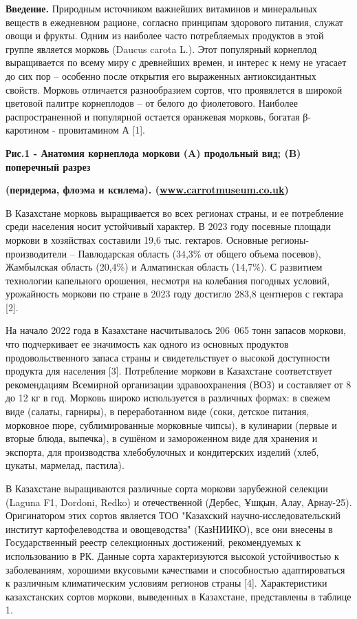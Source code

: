 {\bfseries Введение.} Природным источником важнейших витаминов и
минеральных веществ в ежедневном рационе, согласно принципам здорового
питания, служат овощи и фрукты. Одним из наиболее часто потребляемых
продуктов в этой группе является морковь (Daucus carota L.). Этот
популярный корнеплод выращивается по всему миру с древнейших времен, и
интерес к нему не угасает до сих пор -- особенно после открытия его
выраженных антиоксидантных свойств. Морковь отличается разнообразием
сортов, что проявялется в широкой цветовой палитре корнеплодов -- от
белого до фиолетового. Наиболее распространенной и популярной остается
оранжевая морковь, богатая β-каротином - провитамином А {[}1{]}.


{\bfseries Рис.1 - Анатомия корнеплода моркови (A) продольный вид; (B)
поперечный разрез}

{\bfseries (перидерма, флоэма и ксилема).
(\href{http://www.carrotmuseum.co.uk}{www.carrotmuseum.co.uk})}

В Казахстане морковь выращивается во всех регионах страны, и ее
потребление среди населения носит устойчивый характер. В 2023 году
посевные площади моркови в хозяйствах составили 19,6 тыс. гектаров.
Основные регионы-производители -- Павлодарская область (34,3\% от общего
объема посевов), Жамбылская область (20,4\%) и Алматинская область
(14,7\%). С развитием технологии капельного орошения, несмотря на
колебания погодных условий, урожайность моркови по стране в 2023 году
достигло 283,8 центнеров с гектара {[}2{]}.

На начало 2022 года в Казахстане насчитывалось 206~065 тонн запасов
моркови, что подчеркивает ее значимость как одного из основных продуктов
продовольственного запаса страны и свидетельствует о высокой доступности
продукта для населения {[}3{]}. Потребление моркови в Казахстане
соответствует рекомендациям Всемирной организации здравоохранения (ВОЗ)
и составляет от 8 до 12 кг в год. Морковь широко используется в
различных формах: в свежем виде (салаты, гарниры), в переработанном виде
(соки, детское питания, морковное пюре, сублимированные морковные
чипсы), в кулинарии (первые и вторые блюда, выпечка), в сушёном и
замороженном виде для хранения и экспорта, для производства
хлебобулочных и кондитерских изделий (хлеб, цукаты, мармелад, пастила).

В Казахстане выращиваются различные сорта моркови зарубежной селекции
(Laguna F1, Dordoni, Redko) и отечественной (Дербес, Ұшқын, Алау,
Арнау-25). Оригинатором этих сортов является ТОО "Казахский
научно-исследовательский институт картофелеводства и овощеводства"
(КазНИИКО), все они внесены в Государственный реестр селекционных
достижений, рекомендуемых к использованию в РК. Данные сорта
характеризуются высокой устойчивостью к заболеваниям, хорошими вкусовыми
качествами и способностью адаптироваться к различным климатическим
условиям регионов страны {[}4{]}. Характеристики казахстанских сортов
моркови, выведенных в Казахстане, представлены в таблице 1.

